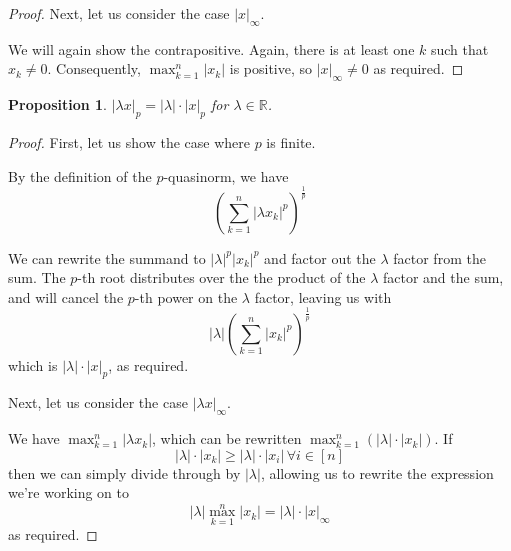 \documentclass[letterpaper,11pt]{article}
\newtheorem{prop}{Proposition}
\newcommand{\R}{\mathbb{R}}
\begin{document}
\begin{enumerate}
\begin{proof}
            Next, let us consider the case $|x|_\infty$.

            We will again show the contrapositive. Again, there is at least one
            $k$ such that $x_k \neq 0$. Consequently, $\max_{k=1}^n |x_k|$ is
            positive, so $|x|_\infty \neq 0$ as required.
        \end{proof}

        \begin{prop}
            $|\lambda x|_p = |\lambda| \cdot |x|_p$ for $\lambda \in \R$.
        \end{prop}

        \begin{proof}
            First, let us show the case where $p$ is finite.

            By the definition of the $p$-quasinorm, we have
            \begin{equation*}
                \left( \sum_{k=1}^n |\lambda x_k|^p \right) ^ \frac{1}{p}
            \end{equation*}

            We can rewrite the summand to $|\lambda|^p |x_k|^p$ and factor out
            the $\lambda$ factor from the sum. The $p$-th root distributes over
            the the product of the $\lambda$ factor and the sum, and will
            cancel the $p$-th power on the $\lambda$ factor, leaving us with
            \begin{equation*}
                |\lambda| \left ( \sum_{k=1}^n |x_k|^p \right) ^ \frac{1}{p}
            \end{equation*}
            which is $|\lambda| \cdot |x|_p$, as required.

            Next, let us consider the case $|\lambda x|_\infty$.

            We have $\max_{k=1}^n |\lambda x_k|$, which can be rewritten
            $\max_{k=1}^n (|\lambda| \cdot |x_k|)$. If
            \begin{equation*}
                |\lambda| \cdot |x_k| \geq |\lambda| \cdot |x_i|\,
                \forall i \in [n]
            \end{equation*}
            then we can simply divide through by $|\lambda|$, allowing us to
            rewrite the expression we're working on to
            \begin{equation*}
                |\lambda| \max_{k=1}^n |x_k| = |\lambda| \cdot |x|_\infty
            \end{equation*}
            as required.
        \end{proof}


\end{enumerate}
\end{document}
